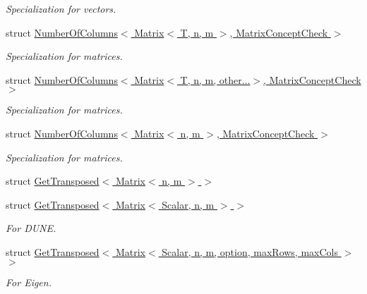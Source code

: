 \begin{DoxyCompactItemize}
\begin{DoxyCompactList}\small\item\em \-Specialization for vectors. \end{DoxyCompactList}\item 
struct \hyperlink{structFunG_1_1LinearAlgebra_1_1NumberOfColumns_3_01Matrix_3_01T_00_01n_00_01m_01_4_00_01MatrixConceptCheck_01_4}{\-Number\-Of\-Columns$<$ Matrix$<$ T, n, m $>$, Matrix\-Concept\-Check $>$}
\begin{DoxyCompactList}\small\item\em \-Specialization for matrices. \end{DoxyCompactList}\item 
struct \hyperlink{structFunG_1_1LinearAlgebra_1_1NumberOfColumns_3_01Matrix_3_01T_00_01n_00_01m_00_01other_8_8_8_4_00_01MatrixConceptCheck_01_4}{\-Number\-Of\-Columns$<$ Matrix$<$ T, n, m, other...$>$, Matrix\-Concept\-Check $>$}
\begin{DoxyCompactList}\small\item\em \-Specialization for matrices. \end{DoxyCompactList}\item 
struct \hyperlink{structFunG_1_1LinearAlgebra_1_1NumberOfColumns_3_01Matrix_3_01n_00_01m_01_4_00_01MatrixConceptCheck_01_4}{\-Number\-Of\-Columns$<$ Matrix$<$ n, m $>$, Matrix\-Concept\-Check $>$}
\begin{DoxyCompactList}\small\item\em \-Specialization for matrices. \end{DoxyCompactList}\item 
struct \hyperlink{structFunG_1_1LinearAlgebra_1_1GetTransposed_3_01Matrix_3_01n_00_01m_01_4_01_4}{\-Get\-Transposed$<$ Matrix$<$ n, m $>$ $>$}
\item 
struct \hyperlink{structFunG_1_1LinearAlgebra_1_1GetTransposed_3_01Matrix_3_01Scalar_00_01n_00_01m_01_4_01_4}{\-Get\-Transposed$<$ Matrix$<$ Scalar, n, m $>$ $>$}
\begin{DoxyCompactList}\small\item\em \-For \-D\-U\-N\-E. \end{DoxyCompactList}\item 
struct \hyperlink{structFunG_1_1LinearAlgebra_1_1GetTransposed_3_01Matrix_3_01Scalar_00_01n_00_01m_00_01option_00_837706e7e2f5ff6060578b88ee4bef60}{\-Get\-Transposed$<$ Matrix$<$ Scalar, n, m, option, max\-Rows, max\-Cols $>$ $>$}
\begin{DoxyCompactList}\small\item\em \-For \-Eigen. \end{DoxyCompactList}\end{DoxyCompactItemize}
